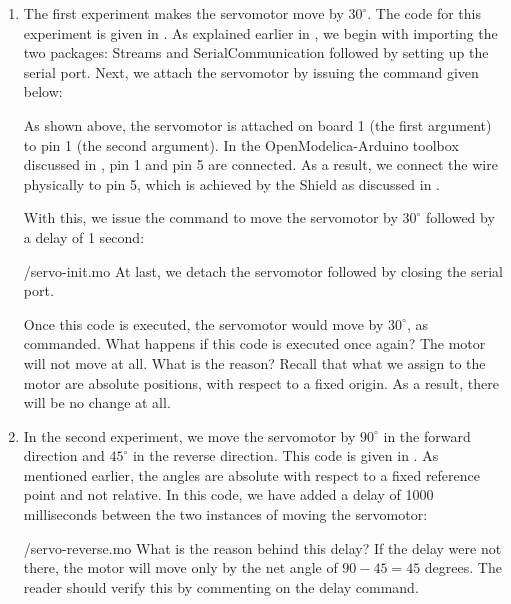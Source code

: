\begin{enumerate}

  \item The first experiment makes the servomotor move by $30^\circ$. The code for this experiment is
        given in . As explained earlier in , 
        we begin with importing the two packages: Streams and SerialCommunication followed 
        by setting up the serial port. Next, we attach the servomotor by issuing the command given below:
        
        
        As shown above, the servomotor is attached on board 1 (the first argument)
        to pin 1 (the second argument).  In the OpenModelica-Arduino toolbox discussed 
        in , pin 1 and pin 5 are connected. As a result, we connect the wire physically to
        pin 5, which is achieved by the Shield as discussed in .
        
        With this, we issue the command to move the servomotor by $30^\circ$ followed by a delay of 
        1 second:
        
        {\LocSEROpenModelicacode/servo-init.mo}
        At last, we  detach the servomotor followed by closing the serial port. 
        
        Once this code is executed, the servomotor would move by
        $30^\circ$, as commanded.  What happens if this code is executed
        once again?  The motor will not move at all.  What is the reason?
        Recall that what we assign to the motor are absolute positions, with
        respect to a fixed origin.  As a result, there will be no change at
        all. 
        
  \item In the second experiment, we move the servomotor by $90^\circ$ in the
        forward direction and $45^\circ$ in the reverse direction.  This
        code is given in .  As mentioned
        earlier, the angles are absolute with respect to a fixed reference
        point and not relative.   In this code, 
        we have added a delay of 1000 milliseconds between the two instances of 
        moving the servomotor: 
        
        {\LocSEROpenModelicacode/servo-reverse.mo}
        What is the reason behind this delay?  If the delay were not
        there, the motor will move only by the net angle of $90-45 = 45$
        degrees.  The reader should verify this by commenting on the delay
        command. 
        

\end{enumerate}
